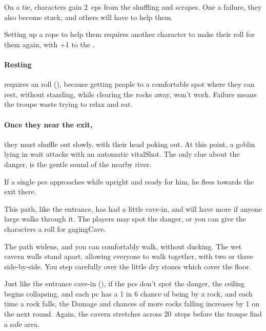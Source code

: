 \begin{multicols}{2}
On a tie, characters gain 2~\glspl{ep} from the shuffling and scrapes.
One a failure, they also become stuck, and others will have to help them.

Setting up a rope to help them requires another character to make their roll for them again, with +1 to the .


\paragraph{Resting}
requires an  roll (\tn[10]), because getting people to a comfortable spot where they can rest, without standing, while clearing the rocks away, won't work.
Failure means the troupe waste  trying to relax and eat.

\paragraph{Once they near the exit,}
they must shuffle out slowly, with their head poking out.
At this point, a goblin lying in wait attacks with an automatic \gls{vitalShot}.
The only clue about the danger, is the gentle sound of the nearby river.

If a single \glspl{pc} approaches while upright and ready for him, he flees towards the exit there.


This path, like the entrance, has had a little cave-in, and will have more if anyone large walks through it.
The players may spot the danger, or you can give the characters a roll for \gls{gagingCave}.

\begin{boxtext}
  The path widens, and you can comfortably walk, without ducking.
  The wet cavern walls stand apart, allowing everyone to walk together, with two or three side-by-side.
  You step carefully over the little dry stones which cover the floor.
\end{boxtext}

\caveIn

Just like the entrance cave-in (), if the \glspl{pc} don't spot the danger, the ceiling begins collapsing, and each \gls{pc} has a 1 in 6 chance of being by a rock, and each time a rock falls, the Damage and chances of more rocks falling increases by 1 on the next \gls{round}.
Again, the cavern stretches across 20~\glspl{step} before the troupe find a safe area.


\end{multicols}
